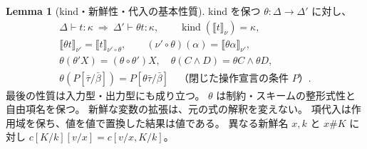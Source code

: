 \documentclass[a4paper,11pt]{article}
\theoremstyle{definition}
\newtheorem{lemma}[definition]{Lemma}
\newcommand{\kind}{\operatorname{kind}}
\newcommand{\den}[1]{\llbracket #1\rrbracket}
\newcommand{\proofspace}{\Needspace{16\baselineskip}}
\begin{document}
\proofspace
\begin{samepage}
\begin{lemma}[kind・新鮮性・代入の基本性質]\label{lem:binding}
kind を保つ $\theta:\Delta\to\Delta'$ に対し、
\begin{gather*}
 \Delta\vdash t:\kappa\ \Longrightarrow\ \Delta'\vdash\theta t:\kappa,
 \qquad \kind(\den t_\nu)=\kappa,\\
 \den{\theta t}_{\nu'}=\den t_{\nu'\circ\theta},
 \qquad (\nu'\circ\theta)(\alpha)=\den{\theta\alpha}_{\nu'},\\
 \theta(\theta' X)=(\theta\circ\theta')X,
 \quad \theta(C\land D)=\theta C\land\theta D,\\
 \theta(P[\bar\tau/\bar\beta])=P[\theta\bar\tau/\bar\beta]
 \quad\text{（閉じた操作宣言の条件 $P$）}.
\end{gather*}
最後の性質は入力型・出力型にも成り立つ。
$\theta$ は制約・スキームの整形式性と自由項名を保つ。
新鮮な変数の拡張は、元の式の解釈を変えない。
項代入は作用域を保ち、値を値で置換した結果は値である。
異なる新鮮名 $x,k$ と $x\#K$ に対し
$c[K/k][v/x]=c[v/x,K/k]$。
\end{lemma}
\end{samepage}
\nopagebreak[4]
\end{document}
